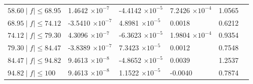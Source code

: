 \documentclass[journal]{IEEEtran}
\begin{document}
\begin{table}[h]
\begin{tabular}{|C{3.5cm}|C{2.5cm}|C{2.5cm}|C{2.5cm}|C{2.5cm}|m{0cm}}
		$58.60 \mid f\mid \leq 68.95$ & 1.4642  $\times 10^{-7}$ & -4.4142 $\times 10^{-5}$ & 7.2426 $\times 10^{-4}$  & 1.0565 &\\ 
		$68.95 \mid f\mid \leq 74.12$ & -3.5410 $\times 10^{-7}$ & 4.8981 $\times 10^{-5}$  & 0.0018 					& 0.6212 &\\ 
		$74.12 \mid f\mid \leq 79.30$ & 4.3096  $\times 10^{-7}$ & -6.3623 $\times 10^{-5}$ & 1.9804 $\times 10^{-4}$  & 0.9354 &\\ 
		$79.30 \mid f\mid \leq 84.47$ & -3.8389 $\times 10^{-7}$ & 7.3423 $\times 10^{-5}$  & 0.0012					& 0.7548 &\\ 
		$84.47 \mid f\mid \leq 94.82$ & 9.4613 $\times 10^{-8}$  & -4.8652 $\times 10^{-5}$ & 0.0039 					& 1.2537 &\\ 
		$94.82 \mid f\mid \leq 100$   & 9.4613  $\times 10^{-8}$ & 1.1522 $\times 10^{-5}$  & -0.0040					& 0.7874 &\\ 
	\end{tabular}
\end{table}
\end{document}

